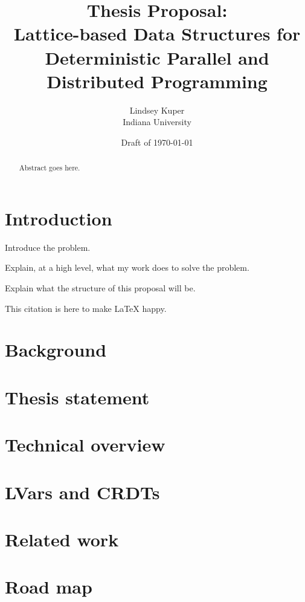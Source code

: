 \documentclass{article}
\begin{document}
\title{Thesis Proposal: \\
  Lattice-based Data Structures for \\
  Deterministic Parallel and Distributed Programming}

\author{Lindsey Kuper \\ Indiana University}

\date{Draft of \today}

\maketitle

\begin{abstract}
  Abstract goes here.
\end{abstract}

\section{Introduction}

Introduce the problem.

Explain, at a high level, what my work does to solve the problem.

Explain what the structure of this proposal will be.

This citation \cite{LVars-TR} is here to make LaTeX happy.

\section{Background}

\section{Thesis statement}

\section{Technical overview}

\section{LVars and CRDTs}

\section{Related work}

\section{Road map}



\end{document}
